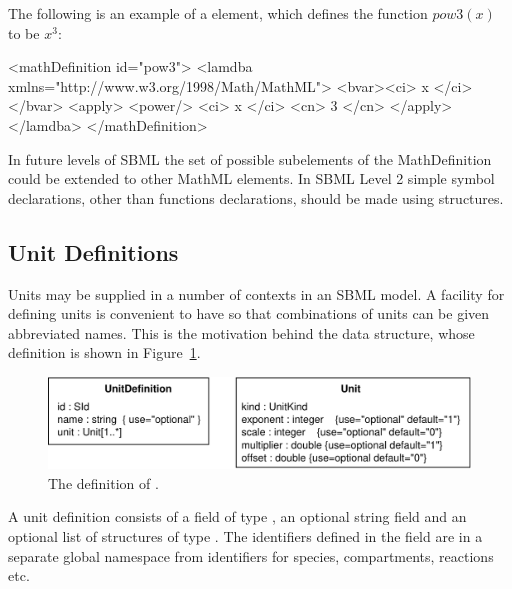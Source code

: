 \documentclass[10pt]{cekarticle}
\newcommand{\vref}[1]{\ref{#1}}
\begin{document}
The following is an example of a  element,
which defines the function $pow3(x)$ to be $x^{3}$:

\begin{example}
<mathDefinition id="pow3">
    <lamdba xmlns="http://www.w3.org/1998/Math/MathML">
        <bvar><ci> x </ci></bvar>
        <apply>
            <power/>
            <ci> x </ci>
            <cn> 3 </cn>
        </apply>
    </lamdba>
</mathDefinition>
\end{example}

In future levels of SBML the set of possible subelements of the
MathDefinition could be extended to other MathML elements.  In
SBML Level 2 simple symbol declarations, other than functions
declarations, should be made using  structures.

\subsection{Unit Definitions}
\label{sec:unitdefinitions}

Units may be supplied in a number of contexts in an SBML model.  A
facility for defining units is convenient to have so that
combinations of units can be given abbreviated names.  This is the
motivation behind the  data structure, whose
definition is shown in Figure~\vref{fig:unitdefinition}.

\begin{figure}[htb]
  \centering
  \includegraphics[scale = 0.68]{unitdefinition}
  \caption{The definition of .}
  \label{fig:unitdefinition}
\end{figure}

A unit definition consists of a  field of type
, an optional string field  and an
optional list of structures of type . The identifiers
defined in the  field are in a separate global
namespace from identifiers for species, compartments, reactions
etc.
\end{document}
